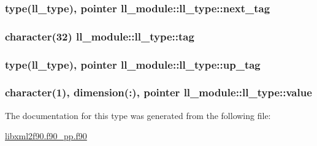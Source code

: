 \subsubsection[{\texorpdfstring{next\+\_\+tag}{next_tag}}]{\setlength{\rightskip}{0pt plus 5cm}type({\bf ll\+\_\+type}), pointer ll\+\_\+module\+::ll\+\_\+type\+::next\+\_\+tag}\hypertarget{structll__module_1_1ll__type_af5be22fa182b45e18c47d040cb88a6c0}{}\label{structll__module_1_1ll__type_af5be22fa182b45e18c47d040cb88a6c0}
\subsubsection[{\texorpdfstring{tag}{tag}}]{\setlength{\rightskip}{0pt plus 5cm}character(32) ll\+\_\+module\+::ll\+\_\+type\+::tag}\hypertarget{structll__module_1_1ll__type_a984131c3c61b8fb97170e5e376c40b09}{}\label{structll__module_1_1ll__type_a984131c3c61b8fb97170e5e376c40b09}
\subsubsection[{\texorpdfstring{up\+\_\+tag}{up_tag}}]{\setlength{\rightskip}{0pt plus 5cm}type({\bf ll\+\_\+type}), pointer ll\+\_\+module\+::ll\+\_\+type\+::up\+\_\+tag}\hypertarget{structll__module_1_1ll__type_ac65372c106a08fe5f5e7bec2199c513f}{}\label{structll__module_1_1ll__type_ac65372c106a08fe5f5e7bec2199c513f}
\subsubsection[{\texorpdfstring{value}{value}}]{\setlength{\rightskip}{0pt plus 5cm}character(1), dimension(\+:), pointer ll\+\_\+module\+::ll\+\_\+type\+::value}\hypertarget{structll__module_1_1ll__type_aae295ec399655c86ef3a9cd31bf00004}{}\label{structll__module_1_1ll__type_aae295ec399655c86ef3a9cd31bf00004}


The documentation for this type was generated from the following file\+:\begin{DoxyCompactItemize}
\item 
\hyperlink{libxml2f90_8f90__pp_8f90}{libxml2f90.\+f90\+\_\+pp.\+f90}\end{DoxyCompactItemize}
